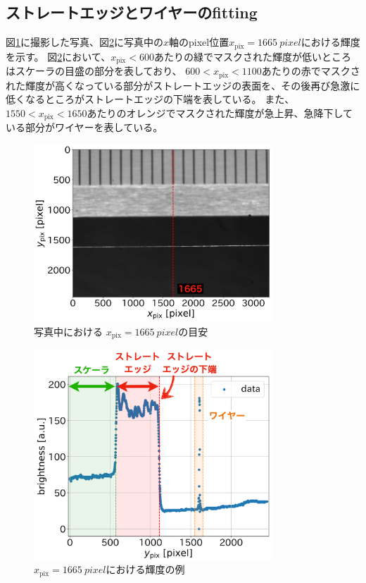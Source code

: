 \documentclass[../../main.tex]{subfiles}
\begin{document}
\subsection{ストレートエッジとワイヤーのfitting}
図\ref{fig:wiresag_edge_target}に撮影した写真、図\ref{fig:wiresag_edge_brightness}に写真中の$x$軸のpixel位置$x_{\mathrm{pix}}=\SI{1665}{pixel}$における輝度を示す。
図\ref{fig:wiresag_edge_brightness}において、$x_{\mathrm{pix}}<600$あたりの緑でマスクされた輝度が低いところはスケーラの目盛の部分を表しており、
$600 < x_{\mathrm{pix}} < 1100$あたりの赤でマスクされた輝度が高くなっている部分がストレートエッジの表面を、その後再び急激に低くなるところがストレートエッジの下端を表している。
また、$1550 < x_{\mathrm{pix}} < 1650$あたりのオレンジでマスクされた輝度が急上昇、急降下している部分がワイヤーを表している。
\begin{figure}[H]
    \centering
    \includegraphics[width=0.8\textwidth]{wiresag/wiresag_edge_target.pdf}
    \caption{写真中における $x_{\mathrm{pix}}=\SI{1665}{pixel}$の目安}
    \label{fig:wiresag_edge_target}
\end{figure}
\begin{figure}[H]
    \centering
    \includegraphics[width=0.8\textwidth]{wiresag/wiresag_edge_brightness.pdf}
    \caption{$x_{\mathrm{pix}}=\SI{1665}{pixel}$における輝度の例}
    \label{fig:wiresag_edge_brightness}
\end{figure}
\end{document}
